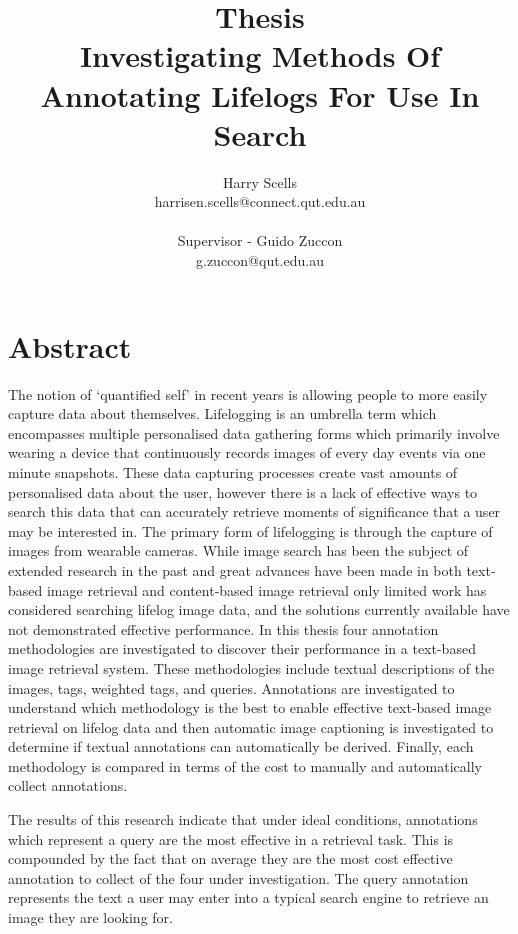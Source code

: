 \documentclass[12pt,a4paper]{book}
\begin{document}
\title{\small Thesis\\\huge Investigating Methods Of Annotating Lifelogs For Use In Search}

\author{Harry Scells\\harrisen.scells@connect.qut.edu.au\\\\\small Supervisor - Guido Zuccon\\\small g.zuccon@qut.edu.au\\}
\maketitle

\chapter*{Abstract}
The notion of `quantified self' in recent years is allowing people to more easily capture data about themselves. Lifelogging is an umbrella term which encompasses multiple personalised data gathering forms which primarily involve wearing a device that continuously records images of every day events via one minute snapshots. These data capturing processes create vast amounts of personalised data about the user, however there is a lack of effective ways to search this data that can accurately retrieve moments of significance that a user may be interested in. The primary form of lifelogging is through the capture of images from wearable cameras. While image search has been the subject of extended research in the past and great advances have been made in both text-based image retrieval and content-based image retrieval only limited work has considered searching lifelog image data, and the solutions currently available have not demonstrated effective performance. In this thesis four annotation methodologies are investigated to discover their performance in a text-based image retrieval system. These methodologies include textual descriptions of the images, tags, weighted tags, and queries. Annotations are investigated to understand which methodology is the best to enable effective text-based image retrieval on lifelog data and then automatic image captioning is investigated to determine if textual annotations can automatically be derived. Finally, each methodology is compared in terms of the cost to manually and automatically collect annotations.

The results of this research indicate that under ideal conditions, annotations which represent a query are the most effective in a retrieval task. This is compounded by the fact that on average they are the most cost effective annotation to collect of the four under investigation. The query annotation represents the text a user may enter into a typical search engine to retrieve an image they are looking for.
\end{document}
